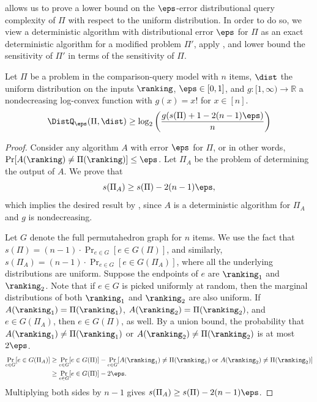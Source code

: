 \documentclass{toc}
\begin{document}
 allows us to prove a lower bound on the $\eps$-error distributional query complexity of $\Pi$ with respect to the uniform distribution. In order to do so, we view a deterministic algorithm with distributional error $\eps$ for $\Pi$ as an exact deterministic algorithm for a modified problem $\Pi'$, apply , and lower bound the sensitivity of $\Pi'$ in terms of the sensitivity of $\Pi$.

\begin{proposition}
	\label{claim:sensitivity:partial}
	Let $\Pi$ be a problem in the comparison-query model with $n$ items, $\dist$ the uniform distribution on the inputs $\ranking$, $\eps\in [0,1]$, and $g: [1,\infty) \to \mathbb{R}$ a nondecreasing log-convex function with $g(x) = x!$ for $x \in [n]$.
	\begin{equation}\label{eq:prop:sensitivity:randomized}
	\DistQ_{\eps}(\Pi,\dist)\ge \log_2 \left(\frac{g(s(\Pi)+1-2(n-1)\eps)}{n}\right)
	\end{equation}
\end{proposition}

\begin{proof}
	Consider any algorithm $A$ with error $\eps$ for $\Pi$, or in other words, $\Pr[A(\ranking)\neq\Pi(\ranking)] \le \eps$. Let $\Pi_A$ be the problem of determining the output of $A$. We prove that 
	\[ s(\Pi_A)\ge s(\Pi)-2(n-1)\eps,\]
	which implies the desired result by , since $A$ is a deterministic algorithm for $\Pi_A$ and $g$ is nondecreasing.
	
	Let $G$ denote the full permutahedron graph for $n$ items. We use the fact that $s(\Pi)=(n-1)\cdot \Pr_{e\in G}[e \in G(\Pi)]$, and similarly, $s(\Pi_A)=(n-1)\cdot \Pr_{e\in G}[e \in G(\Pi_A)]$, where all the underlying distributions are uniform. Suppose the endpoints of $e$ are $\ranking_1$ and $\ranking_2$. Note that if $e \in G$ is picked uniformly at random, then the marginal distributions of both $\ranking_1$ and $\ranking_2$ are also uniform. If $A(\ranking_1)=\Pi(\ranking_1)$, $A(\ranking_2)=\Pi(\ranking_2)$, and $e\in G(\Pi_A)$, then $e\in G(\Pi)$, as well. By a union bound, the probability that $A(\ranking_1) \neq \Pi(\ranking_1)$ or $A(\ranking_2) \neq \Pi(\ranking_2)$ is at most $2\eps$. 
	\begin{align*}
		\Pr_{e\in G}[e\in G(\Pi_A)] &\ge \Pr_{e\in G}[e\in G(\Pi)] - \Pr_{e\in G}[A(\ranking_1)\neq \Pi(\ranking_1)\text{ or }A(\ranking_2)\neq \Pi(\ranking_2)]\\
		&\ge \Pr_{e\in G}[e\in G(\Pi)] - 2\eps.
	\end{align*}
	Multiplying both sides by $n-1$ gives $s(\Pi_A)\ge s(\Pi)-2(n-1)\eps$.
\end{proof}
\end{document}
